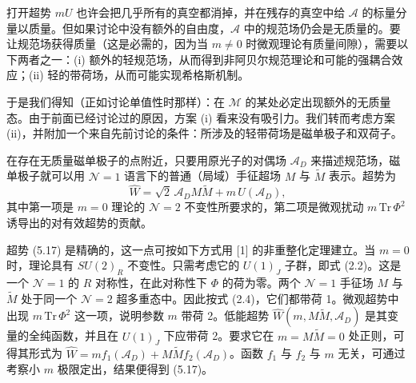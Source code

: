 \documentclass[11pt,a4paper,UTF8,fontset=fandol]{ctexart}
\theoremstyle{plain}
\theoremstyle{definition}
\begin{document}
打开超势 $mU$ 也许会把几乎所有的真空都消掉，并在残存的真空中给 $\mathcal A$ 的标量分量以质量。但如果讨论中没有额外的自由度，$\mathcal A$ 中的规范场仍会是无质量的。要让规范场获得质量（这是必需的，因为当 $m\neq 0$ 时微观理论有质量间隙），需要以下两者之一：(i) 额外的轻规范场，从而得到非阿贝尔规范理论和可能的强耦合效应；(ii) 轻的带荷场，从而可能实现希格斯机制。

于是我们得知（正如讨论单值性时那样）：在 $\mathcal M$ 的某处必定出现额外的无质量态。由于前面已经讨论过的原因，方案 (i) 看来没有吸引力。我们转而考虑方案 (ii)，并附加一个来自先前讨论的条件：所涉及的轻带荷场是磁单极子和双荷子。

在存在无质量磁单极子的点附近，只要用原光子的对偶场 $\mathcal A_D$ 来描述规范场，磁单极子就可以用 $\mathcal N=1$ 语言下的普通（局域）手征超场 $M$ 与 $\widetilde M$ 表示。超势为
\begin{equation}
    \widehat W = \sqrt{2}\,\mathcal A_D M\widetilde M + m\,U(\mathcal A_D), \tag{5.17}
\end{equation}
其中第一项是 $m=0$ 理论的 $\mathcal N=2$ 不变性所要求的，第二项是微观扰动 $m\,\mathrm{Tr}\,\Phi^2$ 诱导出的对有效超势的贡献。

超势 (5.17) 是精确的，这一点可按如下方式用 [1] 的非重整化定理建立。当 $m=0$ 时，理论具有 $SU(2)_R$ 不变性。只需考虑它的 $U(1)_J$ 子群，即式 (2.2)。这是一个 $\mathcal N=1$ 的 $R$ 对称性，在此对称性下 $\Phi$ 的荷为零。两个 $\mathcal N=1$ 手征场 $M$ 与 $\widetilde M$ 处于同一个 $\mathcal N=2$ 超多重态中。因此按式 (2.4)，它们都带荷 1。微观超势中出现 $m\,\mathrm{Tr}\,\Phi^2$ 这一项，说明参数 $m$ 带荷 2。低能超势 $\widehat W(m,M\widetilde M,\mathcal A_D)$ 是其变量的全纯函数，并且在 $U(1)_J$ 下应带荷 2。要求它在 $m=M\widetilde M=0$ 处正则，可得其形式为 $\widehat W=m f_1(\mathcal A_D)+M\widetilde M f_2(\mathcal A_D)$。函数 $f_1$ 与 $f_2$ 与 $m$ 无关，可通过考察小 $m$ 极限定出，结果便得到 (5.17)。
\end{document}
